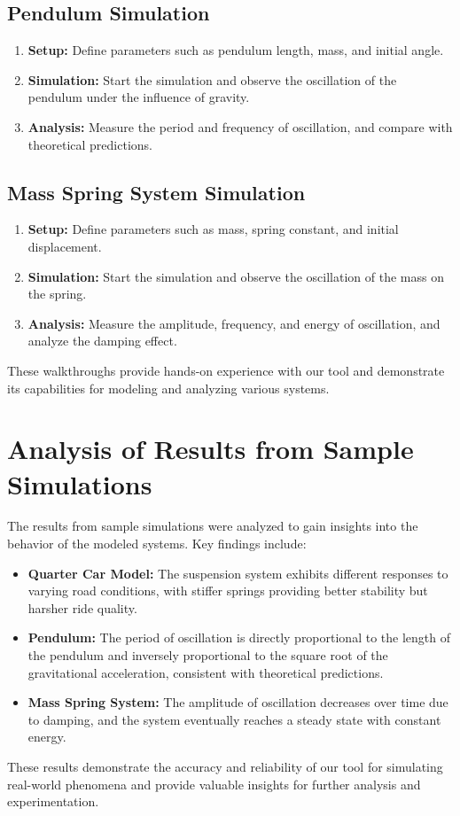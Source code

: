 \subsection{Pendulum Simulation}

\begin{enumerate}
    \item \textbf{Setup:} Define parameters such as pendulum length, mass, and initial angle.
    \item \textbf{Simulation:} Start the simulation and observe the oscillation of the pendulum under the influence of gravity.
    \item \textbf{Analysis:} Measure the period and frequency of oscillation, and compare with theoretical predictions.
\end{enumerate}

\subsection{Mass Spring System Simulation}

\begin{enumerate}
    \item \textbf{Setup:} Define parameters such as mass, spring constant, and initial displacement.
    \item \textbf{Simulation:} Start the simulation and observe the oscillation of the mass on the spring.
    \item \textbf{Analysis:} Measure the amplitude, frequency, and energy of oscillation, and analyze the damping effect.
\end{enumerate}

These walkthroughs provide hands-on experience with our tool and demonstrate its capabilities for modeling and analyzing various systems.

\section{Analysis of Results from Sample Simulations}

The results from sample simulations were analyzed to gain insights into the behavior of the modeled systems. Key findings include:

\begin{itemize}
    \item \textbf{Quarter Car Model:} The suspension system exhibits different responses to varying road conditions, with stiffer springs providing better stability but harsher ride quality.
    \item \textbf{Pendulum:} The period of oscillation is directly proportional to the length of the pendulum and inversely proportional to the square root of the gravitational acceleration, consistent with theoretical predictions.
    \item \textbf{Mass Spring System:} The amplitude of oscillation decreases over time due to damping, and the system eventually reaches a steady state with constant energy.
\end{itemize}

These results demonstrate the accuracy and reliability of our tool for simulating real-world phenomena and provide valuable insights for further analysis and experimentation.
